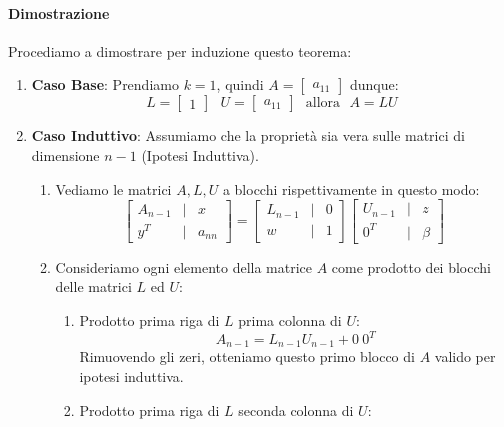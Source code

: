 \documentclass{article}
\begin{document}
\paragraph{Dimostrazione}

Procediamo a dimostrare per induzione questo teorema:

\begin{enumerate}
    \item \textbf{Caso Base}: Prendiamo $k=1$, quindi $A=\begin{bmatrix}
       a_{11}
   \end{bmatrix}$ dunque:
   \[ L=\begin{bmatrix}
       1
   \end{bmatrix} \: \: \:
   U=
   \begin{bmatrix}
       a_{11}
   \end{bmatrix} \:\:\:
   \text{allora}
   \:\:\:
   A=LU\]
   \item \textbf{Caso Induttivo}: Assumiamo che la proprietà sia vera sulle matrici di dimensione $n-1$ (Ipotesi Induttiva).
   \begin{enumerate}
       \item Vediamo le matrici $A, L, U$ a blocchi rispettivamente in questo modo:
       \[ \begin{bmatrix}
           A_{n-1} & | & x\\
           \hline
           y^T & | & a_{nn}
       \end{bmatrix} =
       \begin{bmatrix}
           L_{n-1} & | & 0\\
           \hline
           w & | & 1
       \end{bmatrix}
       \begin{bmatrix}
           U_{n-1} & | & z\\
           \hline
           0^T & | & \beta
       \end{bmatrix}
       \]
       \item Consideriamo ogni elemento della matrice $A$ come prodotto dei blocchi delle matrici $L$ ed $U$:
       \begin{enumerate}
           \item Prodotto prima riga di $L$ prima colonna di $U$:
           \[ A_{n-1} = L_{n-1}U_{n-1} + 0\:0^{T}\]
           Rimuovendo gli zeri, otteniamo questo primo blocco di $A$ valido per ipotesi induttiva.
           \newpage
           \item Prodotto prima riga di $L$ seconda colonna di $U$:

\end{enumerate}
\end{enumerate}
\end{enumerate}
\end{document}
